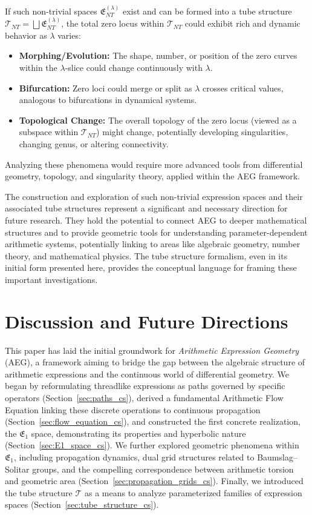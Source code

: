 \documentclass[12pt]{article}
\begin{document}
If such non-trivial spaces \( \mathfrak{E}_{NT}^{(\lambda)} \) exist and can be formed into a tube structure \( \mathcal{T}_{NT} = \bigsqcup \mathfrak{E}_{NT}^{(\lambda)} \), the total zero locus within \( \mathcal{T}_{NT} \) could exhibit rich and dynamic behavior as \( \lambda \) varies:
\begin{itemize}
    \item \textbf{Morphing/Evolution:} The shape, number, or position of the zero curves within the \( \lambda \)-slice could change continuously with \( \lambda \).
    \item \textbf{Bifurcation:} Zero loci could merge or split as \( \lambda \) crosses critical values, analogous to bifurcations in dynamical systems.
    \item \textbf{Topological Change:} The overall topology of the zero locus (viewed as a subspace within \( \mathcal{T}_{NT} \)) might change, potentially developing singularities, changing genus, or altering connectivity.
\end{itemize}
Analyzing these phenomena would require more advanced tools from differential geometry, topology, and singularity theory, applied within the AEG framework.

The construction and exploration of such non-trivial expression spaces and their associated tube structures represent a significant and necessary direction for future research. They hold the potential to connect AEG to deeper mathematical structures and to provide geometric tools for understanding parameter-dependent arithmetic systems, potentially linking to areas like algebraic geometry, number theory, and mathematical physics. The tube structure formalism, even in its initial form presented here, provides the conceptual language for framing these important investigations.

\section{Discussion and Future Directions} %

This paper has laid the initial groundwork for \emph{Arithmetic Expression Geometry} (AEG), a framework aiming to bridge the gap between the algebraic structure of arithmetic expressions and the continuous world of differential geometry. We began by reformulating threadlike expressions as paths governed by specific operators (Section~\ref{sec:paths_cs}), derived a fundamental Arithmetic Flow Equation linking these discrete operations to continuous propagation (Section~\ref{sec:flow_equation_cs}), and constructed the first concrete realization, the \( \mathfrak{E}_1 \) space, demonstrating its properties and hyperbolic nature (Section~\ref{sec:E1_space_cs}). We further explored geometric phenomena within \( \mathfrak{E}_1 \), including propagation dynamics, dual grid structures related to Baumslag–Solitar groups, and the compelling correspondence between arithmetic torsion and geometric area (Section~\ref{sec:propagation_grids_cs}). Finally, we introduced the tube structure \( \mathcal{T} \) as a means to analyze parameterized families of expression spaces (Section~\ref{sec:tube_structure_cs}).
\end{document}
